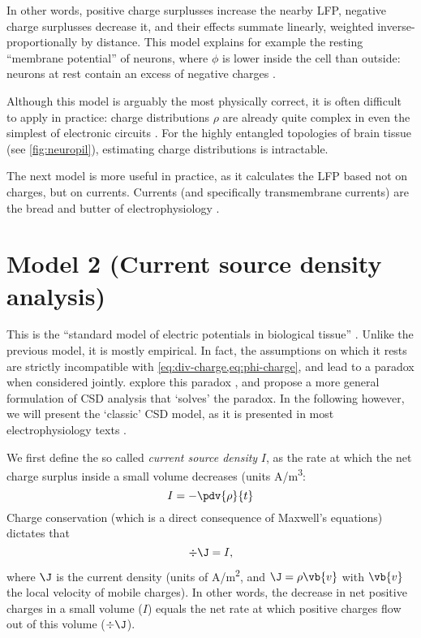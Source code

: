 In other words, positive charge surplusses increase the nearby LFP, negative charge surplusses decrease it, and their effects summate linearly, weighted inverse-proportionally by distance. This model explains for example the resting ``membrane potential'' of neurons, where $\phi$ is lower inside the cell than outside: neurons at rest contain an excess of negative charges \cite{Dayan2001b}.

Although this model is arguably the most physically correct, it is often difficult to apply in practice: charge distributions $\rho$ are already quite complex in even the simplest of electronic circuits \cite[chapter 8]{Chabay2015}. For the highly entangled topologies of brain tissue (see \cref{fig:neuropil}), estimating charge distributions is intractable.

The next model is more useful in practice, as it calculates the LFP based not on charges, but on currents. Currents (and specifically transmembrane currents) are the bread and butter of electrophysiology \cite{Kandel2013a}.



\section{Model 2 (Current source density analysis)}
\label{sec:CSD}

This is the ``standard model of electric potentials in biological tissue'' \cite{Bedard2011}. Unlike the previous model, it is mostly empirical. In fact, the assumptions on which it rests are strictly incompatible with \cref{eq:div-charge,eq:phi-charge}, and lead to a paradox when considered jointly.  explore this paradox \cite{Bedard2011}, and propose a more general formulation of CSD analysis that `solves' the paradox. In the following however, we will present the `classic' CSD model, as it is presented in most electrophysiology texts \cite{Plonsey2007,Nunez2006,Mitzdorf1985,Nicholson1975,Linden2014,Buzsaki2012a}.

We first define the so called \emph{current source density} $I$, as the rate at which the net charge surplus inside a small volume decreases (units A/\si{m^3}:
%
\begin{equation}
\label{eq:CSD}
I = - \pdv{\rho}{t}
\end{equation}
%
Charge conservation (which is a direct consequence of Maxwell's equations) dictates that
%
\begin{equation}
\label{eq:charge-conservation}
\div{\J} = I,
\end{equation}
%
where $\J$ is the current density (units of A/\si{\metre^2}, and $\J = \rho \vb{v}$ with $\vb{v}$ the local velocity of mobile charges). In other words, the decrease in net positive charges in a small volume ($I$) equals the net rate at which positive charges flow out of this volume ($\div{\J}$).

